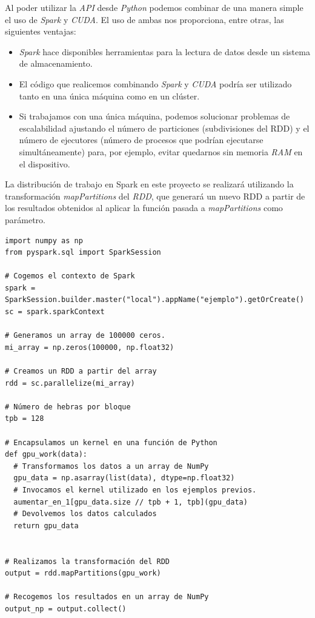 Al poder utilizar la \textit{API} desde \textit{Python} podemos combinar de una manera simple el uso de \textit{Spark} y \textit{CUDA}. El uso de ambas nos proporciona, entre otras, las siguientes ventajas:\\

\begin{itemize}
  \item \textit{Spark} hace disponibles herramientas para la lectura de datos desde un sistema de almacenamiento.
  \item El código que realicemos combinando \textit{Spark} y \textit{CUDA} podría ser utilizado tanto en una única máquina como en un clúster.
  \item Si trabajamos con una única máquina, podemos solucionar problemas de escalabilidad ajustando el número de particiones (subdivisiones del RDD) y el número de ejecutores (número de procesos que podrían ejecutarse simultáneamente) para, por ejemplo, evitar quedarnos sin memoria \textit{RAM} en el dispositivo.\\
\end{itemize}

La distribución de trabajo en Spark en este proyecto se realizará utilizando la transformación \textit{mapPartitions} del \textit{RDD}, que generará un nuevo RDD a partir de los resultados obtenidos al aplicar la función pasada a \textit{mapPartitions} como parámetro. \\

\begin{code}
\begin{verbatim}
import numpy as np
from pyspark.sql import SparkSession

# Cogemos el contexto de Spark
spark = SparkSession.builder.master("local").appName("ejemplo").getOrCreate()
sc = spark.sparkContext

# Generamos un array de 100000 ceros.
mi_array = np.zeros(100000, np.float32)

# Creamos un RDD a partir del array
rdd = sc.parallelize(mi_array)

# Número de hebras por bloque
tpb = 128

# Encapsulamos un kernel en una función de Python
def gpu_work(data):
  # Transformamos los datos a un array de NumPy
  gpu_data = np.asarray(list(data), dtype=np.float32)
  # Invocamos el kernel utilizado en los ejemplos previos.
  aumentar_en_1[gpu_data.size // tpb + 1, tpb](gpu_data)
  # Devolvemos los datos calculados
  return gpu_data


# Realizamos la transformación del RDD
output = rdd.mapPartitions(gpu_work)

# Recogemos los resultados en un array de NumPy
output_np = output.collect()
\end{verbatim}
\label{code:spark}
\end{code}

